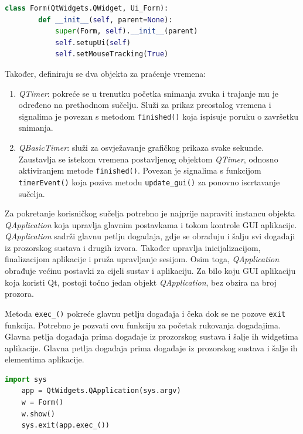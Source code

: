 \begin{lstlisting}[caption={Definicija klase \textit{Form} i njezin konstruktor}, language=Python]
	class Form(QtWidgets.QWidget, Ui_Form):
		def __init__(self, parent=None):
			super(Form, self).__init__(parent)
			self.setupUi(self)
			self.setMouseTracking(True)
\end{lstlisting}

Također, definiraju se dva objekta za praćenje vremena:
\begin{enumerate}
	\item \textit{QTimer}: pokreće se u trenutku početka snimanja zvuka i trajanje mu je određeno na prethodnom sučelju. Služi za prikaz preostalog vremena i signalima je povezan s metodom \lstinline|finished()| koja ispisuje poruku o završetku snimanja.
	\item \textit{QBasicTimer}: služi za osvježavanje grafičkog prikaza svake sekunde. Zaustavlja se istekom vremena postavljenog objektom \textit{QTimer}, odnosno aktiviranjem metode \lstinline|finished()|. Povezan je signalima s funkcijom \lstinline|timerEvent()| koja poziva metodu \lstinline|update_gui()| za ponovno iscrtavanje sučelja.
\end{enumerate}

Za pokretanje korisničkog sučelja potrebno je najprije napraviti instancu objekta \textit{QApplication} koja upravlja glavnim postavkama i tokom kontrole GUI aplikacije. \textit{QApplication} sadrži glavnu petlju događaja, gdje se obrađuju i šalju svi događaji iz prozorskog sustava i drugih izvora. Također upravlja inicijalizacijom, finalizacijom aplikacije i pruža upravljanje sesijom. Osim toga, \textit{QApplication} obrađuje većinu postavki za cijeli sustav i aplikaciju. Za bilo koju GUI aplikaciju koja koristi Qt, postoji točno jedan objekt \textit{QApplication}, bez obzira na broj prozora. 

Metoda \lstinline|exec_()| pokreće glavnu petlju događaja i čeka dok se ne pozove \lstinline|exit| funkcija. Potrebno je pozvati ovu funkciju za početak rukovanja događajima. Glavna petlja događaja prima događaje iz prozorskog sustava i šalje ih widgetima aplikacije. Glavna petlja događaja prima događaje iz prozorskog sustava i šalje ih elementima  aplikacije.

\begin{lstlisting}[caption={Naredbe za pokretanje korisničkog sučelja}, language=Python]
	import sys
	app = QtWidgets.QApplication(sys.argv)
	w = Form()
	w.show()
	sys.exit(app.exec_())
\end{lstlisting}


